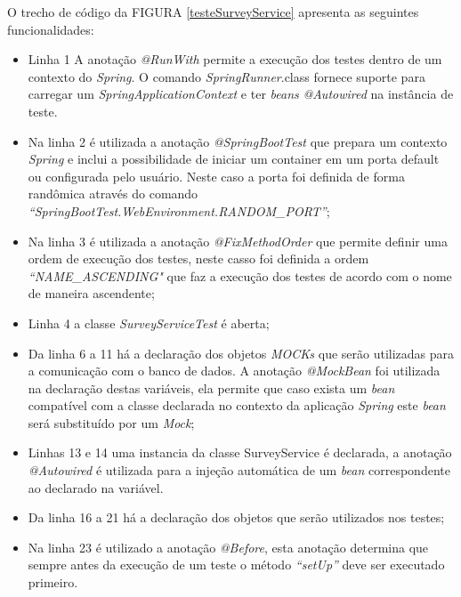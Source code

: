 O trecho de código da FIGURA \ref{testeSurveyService} apresenta as seguintes funcionalidades:


\begin{itemize}

\item Linha 1 A anotação \textit{@RunWith} permite a execução dos testes dentro de um contexto do \textit{Spring}. O comando \textit{SpringRunner}.class fornece suporte para carregar um \textit{Spring}\textit{ApplicationContext} e ter \textit{beans }\textit{@Autowired} na instância de teste.

\item Na linha 2 é utilizada a anotação \textit{@SpringBootTest} que prepara um contexto \textit{Spring} e inclui a possibilidade de iniciar um container em um porta default ou configurada pelo usuário. Neste caso a porta foi definida de forma randômica através do comando \textit{“SpringBootTest.WebEnvironment.RANDOM\_PORT”}; 

 \item Na linha 3 é utilizada a anotação \textit{@FixMethodOrder} que permite definir uma ordem de execução dos testes, neste casso foi definida a ordem \textit{“NAME\_ASCENDING"} que faz a execução dos testes de acordo com o nome de maneira ascendente;

 \item Linha 4 a classe \textit{SurveyServiceTest} é aberta;

 \item Da linha 6 a 11 há a declaração dos objetos \textit{MOCKs} que serão utilizadas para a comunicação com o banco de dados. A anotação \textit{@MockBean} foi utilizada na declaração destas variáveis, ela permite que caso exista um \textit{bean }compatível com a classe declarada no contexto da aplicação \textit{Spring} este \textit{bean }será substituído por um \textit{Mock};

\item Linhas 13 e 14 uma instancia da classe SurveyService é declarada, a anotação \textit{@Autowired} é utilizada para a injeção automática de um \textit{bean }correspondente ao declarado na variável. 
 
\item Da linha 16 a 21 há a declaração dos objetos que serão utilizados nos testes;

 \item Na linha 23 é utilizado a anotação \textit{@Before}, esta anotação determina que sempre antes da execução de um teste o método \textit{“setUp”} deve ser executado primeiro.


\end{itemize}

